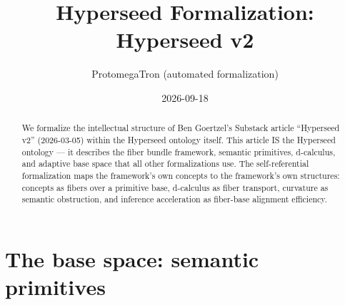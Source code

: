 \documentclass[11pt,a4paper]{article}
\title{Hyperseed Formalization:\\
  Hyperseed v2}
\author{ProtomegaTron (automated formalization)}
\date{2026-09-18}
\begin{document}
\maketitle

\begin{abstract}
We formalize the intellectual structure of Ben Goertzel's Substack article
``Hyperseed v2'' (2026-03-05) within the Hyperseed ontology itself. This
article IS the Hyperseed ontology --- it describes the fiber bundle framework,
semantic primitives, d-calculus, and adaptive base space that all other
formalizations use. The self-referential formalization maps the framework's
own concepts to the framework's own structures: concepts as fibers over a
primitive base, d-calculus as fiber transport, curvature as semantic
obstruction, and inference acceleration as fiber-base alignment efficiency.
\end{abstract}

\tableofcontents

\section{The base space: semantic primitives}
\label{sec:base}
\end{document}
